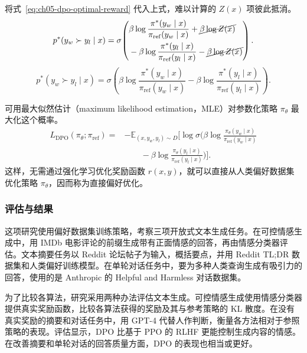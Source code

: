 
将式~\eqref{eq:ch05-dpo-optimal-reward} 代入上式，难以计算的 $Z(x)$ 项彼此抵消。
\begin{equation}
p^*(y_w\succ y_l\mid x)=
\sigma\!\left(
\begin{aligned}
  &\beta\log\frac{\pi^*(y_w\mid x)}{\pi_{\mathrm{ref}}(y_w\mid x)}
  +\cancel{\beta\log Z(x)}\\
  &{}-\beta\log\frac{\pi^*(y_l\mid x)}{\pi_{\mathrm{ref}}(y_l\mid x)}
  -\cancel{\beta\log Z(x)}
\end{aligned}
\right).
\label{eq:ch05-dpo-cancel}
\end{equation}
\begin{equation}
p^*(y_w\succ y_l\mid x)=
\sigma\!\left(\beta\log\frac{\pi^*(y_w\mid x)}{\pi_{\mathrm{ref}}(y_w\mid x)}
 -\beta\log\frac{\pi^*(y_l\mid x)}{\pi_{\mathrm{ref}}(y_l\mid x)}\right).
\label{eq:ch05-dpo-substitution}
\end{equation}

可用最大似然估计（maximum likelihood estimation，MLE）对参数化策略 $\pi_\theta$ 最大化这个概率。
\begin{equation}
\begin{aligned}
L_{\mathrm{DPO}}(\pi_\theta;\pi_{\mathrm{ref}})
={}&-\mathbb{E}_{(x,y_w,y_l)\sim D}\Biggl[
\log\sigma\!\Biggl(
\beta\log\frac{\pi_\theta(y_w\mid x)}{\pi_{\mathrm{ref}}(y_w\mid x)}
\\
&\qquad{}-\beta\log\frac{\pi_\theta(y_l\mid x)}{\pi_{\mathrm{ref}}(y_l\mid x)}
\Biggr)\Biggr].
\end{aligned}
\label{eq:ch05-dpo-loss}
\end{equation}
这样，无需通过强化学习优化奖励函数 $r(x,y)$，就可以直接从人类偏好数据集优化策略 $\pi_\theta$，因而称为直接偏好优化。

\subsubsection{评估与结果}
这项研究使用偏好数据集训练策略，考察三项开放式文本生成任务。在可控情感生成中，用 IMDb 电影评论的前缀生成带有正面情感的回答，再由情感分类器评估。文本摘要任务以 Reddit 论坛帖子为输入，概括要点，并用 Reddit TL;DR 数据集和人类偏好训练模型。在单轮对话任务中，要为多种人类查询生成有吸引力的回答，使用的是 Anthropic 的 Helpful and Harmless 对话数据集。

为了比较各算法，研究采用两种办法评估文本生成。可控情感生成使用情感分类器提供真实奖励函数，比较各算法获得的奖励及其与参考策略的 KL 散度。在没有真实奖励的摘要和对话任务中，用 GPT-4 代替人作判断，衡量各方法相对于参照策略的表现。评估显示，DPO 比基于 PPO 的 RLHF 更能控制生成内容的情感。在改善摘要和单轮对话的回答质量方面，DPO 的表现也相当或更好。
